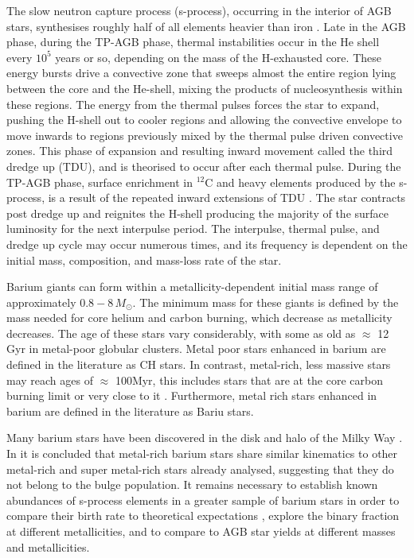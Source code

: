 \documentclass[a4paper,fleqn,usenatbib]{mnras}
\begin{document}
The slow neutron capture process (s-process), occurring in the interior of AGB stars, synthesises roughly half of all elements heavier than iron \citep[e.g.,][]{busso1999,travaglio2001,herwig2005,bisterzo2014,fishlock2014}. Late in the AGB phase, during the TP-AGB phase, thermal instabilities occur in the He shell every $10^5$ years or so, depending on the mass of the H-exhausted core. These energy bursts drive a convective zone that sweeps almost the entire region lying between the core and the He-shell, mixing the products of nucleosynthesis within these regions. The energy from the thermal pulses forces the star to expand, pushing the H-shell out to cooler regions and allowing the convective envelope to move inwards to regions previously mixed by the thermal pulse driven convective zones. This phase of expansion and resulting inward movement called the third dredge up (TDU), and is theorised to occur after each thermal pulse. During the TP-AGB phase, surface enrichment in $^{12}$C and heavy elements produced by the s-process, is a result of the repeated inward extensions of TDU \citep[e.g.,][]{busso2001}. The star contracts post dredge up and reignites the H-shell producing the majority of the surface luminosity for the next interpulse period. The interpulse, thermal pulse, and dredge up cycle may occur numerous times, and its frequency is dependent on the initial mass, composition, and mass-loss rate of the star.

Barium giants can form within a metallicity-dependent initial mass range of approximately $0.8 - 8\,M_{\odot}$. The minimum mass for these giants is defined by the mass needed for core helium and carbon burning, which decrease as metallicity decreases. The age of these stars vary considerably, with some as old as $\approx$ 12\,Gyr in metal-poor globular clusters. Metal poor stars enhanced in barium are defined in the literature as CH stars. In contrast, metal-rich, less massive stars may reach ages of $\approx$ 100Myr, this includes stars that are at the core carbon burning limit or very close to it \citep[e.g.,][]{whitelock2013}. Furthermore, metal rich stars enhanced in barium are defined in the literature as Bariu stars.

Many barium stars have been discovered in the disk and halo of the Milky Way \citep{gomez1997,mennessier1997}. In \citet{pereira2011} it is concluded that metal-rich barium stars share similar kinematics to other metal-rich and super metal-rich stars already analysed, suggesting that they do not belong to the bulge population. It remains necessary to establish known abundances of s-process elements in a greater sample of barium stars in order to compare their birth rate to theoretical expectations \citep{han1995}, explore the binary fraction at different metallicities, and to compare to AGB star yields at different masses and metallicities.
\end{document}
